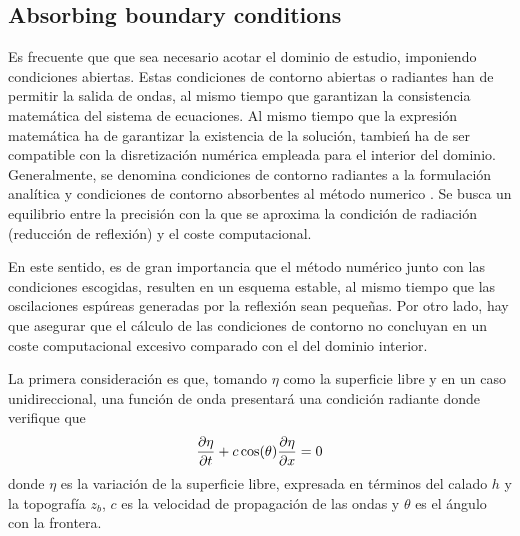\subsection{Absorbing boundary conditions}

Es frecuente que que sea necesario acotar el dominio de estudio, imponiendo condiciones abiertas. Estas condiciones de contorno abiertas o radiantes han de permitir la salida de ondas, al mismo tiempo que garantizan la consistencia matemática del sistema de ecuaciones. Al mismo tiempo que la expresión matemática ha de garantizar la existencia de la solución, tambień ha de ser compatible con la disretización numérica empleada para el interior del dominio. Generalmente, se denomina condiciones de contorno radiantes a la formulación analítica y condiciones de contorno absorbentes al método numerico \cite{navon2004}.
Se busca un equilibrio entre la precisión con la que se aproxima la condición de radiación (reducción de reflexión) y el coste computacional.

En este sentido, es de gran importancia que el método numérico junto con las condiciones escogidas, resulten en un esquema estable, al mismo tiempo que las oscilaciones espúreas generadas por la reflexión sean pequeñas.
Por otro lado, hay que asegurar que el cálculo de las condiciones de contorno no concluyan en un coste computacional excesivo comparado con el del dominio interior.

La primera consideración es que, tomando $\eta$ como la superficie libre y en un caso unidireccional, una función de onda presentará una condición radiante donde verifique que
\begin{equation} \label{radiation_condition}
    \frac{\partial\eta}{\partial t} + c \cos(\theta)\frac{\partial\eta}{\partial x} = 0
\end{equation}
donde $\eta$ es la variación de la superficie libre, expresada en términos del calado $h$ y la topografía $z_b$, $c$ es la velocidad de propagación de las ondas y $\theta$ es el ángulo con la frontera.

